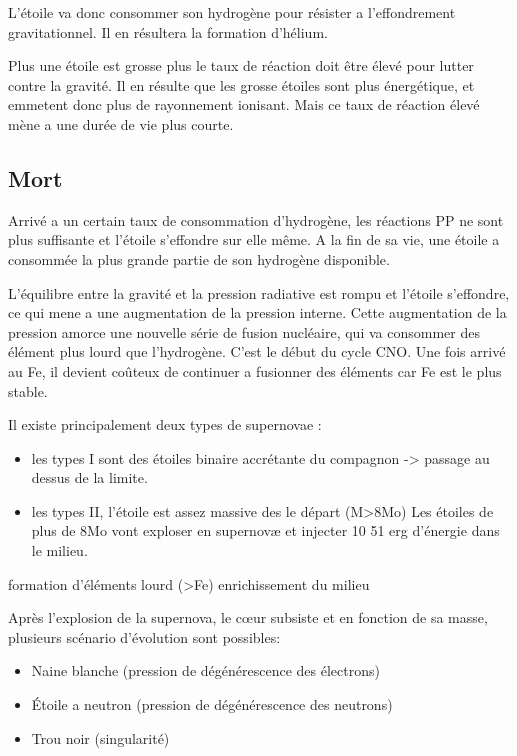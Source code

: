 L'étoile va donc consommer son hydrogène pour résister a l'effondrement gravitationnel.
Il en résultera la formation d'hélium.

Plus une étoile est grosse plus le taux de réaction doit être élevé pour lutter contre la gravité.
Il en résulte que les grosse étoiles sont plus énergétique, et emmetent donc plus de rayonnement ionisant.
Mais ce taux de réaction élevé mène a une durée de vie plus courte.


\subsection{Mort}

Arrivé a un certain taux de consommation d'hydrogène, les réactions PP ne sont plus suffisante et l'étoile s'effondre sur elle même.
A la fin de sa vie, une étoile a consommée la plus grande partie de son hydrogène disponible.

L'équilibre entre la gravité et la pression radiative est rompu et l'étoile s'effondre, ce qui mene a une augmentation de la pression interne.
Cette augmentation de la pression amorce une nouvelle série de fusion nucléaire, qui va consommer des élément plus lourd que l’hydrogène.
C'est le début du cycle CNO.
Une fois arrivé au Fe, il devient coûteux de continuer a fusionner des éléments car Fe est le plus stable.


Il existe principalement deux types de supernovae : 
\begin{itemize}
\item les types I sont des étoiles binaire accrétante du compagnon -> passage au dessus de la limite.
\item les types II, l'étoile est assez massive des le départ (M>8Mo) Les étoiles de plus de 8Mo vont exploser en supernovæ et injecter 10 51 erg d'énergie dans le milieu.
\end{itemize}





formation d'éléments lourd (>Fe)
enrichissement du milieu

Après l'explosion de la supernova, le cœur subsiste et en fonction de sa masse, plusieurs scénario d'évolution sont possibles:
\begin{itemize}
\item Naine blanche (pression de dégénérescence des électrons)
\item Étoile a neutron (pression de dégénérescence des neutrons)
\item Trou noir (singularité)
\end{itemize}

